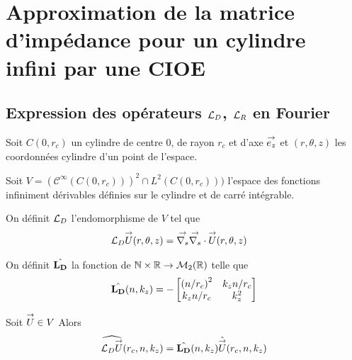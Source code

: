 \section{Approximation de la matrice d'impédance pour un cylindre infini par une CIOE}

  \subsection[Expression des opérateurs LD, LR en Fourier]{Expression des opérateurs \({\mathcal{L}_D}\), \({\mathcal{L}_R}\) en Fourier}
    Soit \(C(0,r_c)\) un cylindre de centre 0, de rayon \(r_c\) et d'axe \({\overset{\rightarrow}{e_z}}\) et \((r,\theta,z)\) les coordonnées cylindre d'un point de l'espace.

    Soit \(V = \left(\mathcal{C}^\infty(C(0,r_c))\right)^2 \cap L^2(C(0,r_c)))\) l'espace des fonctions infiniment dérivables définies sur le cylindre et de carré intégrable.

    \begin{defn}
      \label{eq:cylindre:fourier:LD}
      On définit \({\mathcal{L}_D}\) l'endomorphisme de \(V\) tel que
      \begin{align*}
        {\mathcal{L}_D} {\overset{\rightarrow}{U}}(r,\theta,z) & = {\overset{\rightarrow}{\nabla_s}}{} {\overset{\rightarrow}{\nabla_s}} \cdot{} {\overset{\rightarrow}{U}}(r,\theta,z)
      \end{align*}

      On définit \(\hat{\mathbf{L_D}}\) la fonction de \(\mathbb N\times\mathbb R \rightarrow \mathcal{M}_2(\mathbb R)\) telle que
      \begin{equation*}
        \hat{\mathbf{L_D}}(n,k_z) = -
        \begin{bmatrix}
          \left({n}\slash{r_c}\right)^2 & k_z{n}\slash{r_c}
          \\
          k_z{n}\slash{r_c} & k_z^2
        \end{bmatrix}
      \end{equation*}
    \end{defn}

    \begin{prop}
      Soit \({\overset{\rightarrow}{U}} \in V\)
      Alors
      \begin{equation*}
        \widehat{{\mathcal{L}_D} {\overset{\rightarrow}{U}}} (r_c,n,k_z) = \hat{\mathbf{L_D}}(n,k_z) \hat{{\overset{\rightarrow}{U}}}(r_c,n,k_z)
      \end{equation*}
    \end{prop}

